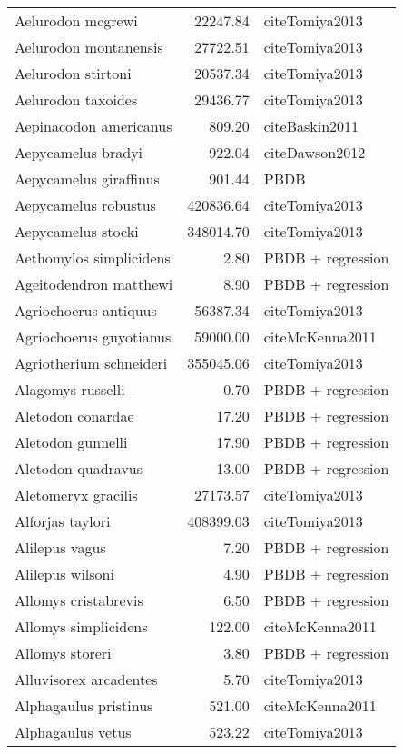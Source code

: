\begin{table}[ht]
\begin{tabular}{lrl}
  Aelurodon mcgrewi & 22247.84 & cite{Tomiya2013} \\ 
  Aelurodon montanensis & 27722.51 & cite{Tomiya2013} \\ 
  Aelurodon stirtoni & 20537.34 & cite{Tomiya2013} \\ 
  Aelurodon taxoides & 29436.77 & cite{Tomiya2013} \\ 
  Aepinacodon americanus & 809.20 & cite{Baskin2011} \\ 
  Aepycamelus bradyi & 922.04 & cite{Dawson2012} \\ 
  Aepycamelus giraffinus & 901.44 & PBDB \\ 
  Aepycamelus robustus & 420836.64 & cite{Tomiya2013} \\ 
  Aepycamelus stocki & 348014.70 & cite{Tomiya2013} \\ 
  Aethomylos simplicidens & 2.80 & PBDB + regression \\ 
  Ageitodendron matthewi & 8.90 & PBDB + regression \\ 
  Agriochoerus antiquus & 56387.34 & cite{Tomiya2013} \\ 
  Agriochoerus guyotianus & 59000.00 & cite{McKenna2011} \\ 
  Agriotherium schneideri & 355045.06 & cite{Tomiya2013} \\ 
  Alagomys russelli & 0.70 & PBDB + regression \\ 
  Aletodon conardae & 17.20 & PBDB + regression \\ 
  Aletodon gunnelli & 17.90 & PBDB + regression \\ 
  Aletodon quadravus & 13.00 & PBDB + regression \\ 
  Aletomeryx gracilis & 27173.57 & cite{Tomiya2013} \\ 
  Alforjas taylori & 408399.03 & cite{Tomiya2013} \\ 
  Alilepus vagus & 7.20 & PBDB + regression \\ 
  Alilepus wilsoni & 4.90 & PBDB + regression \\ 
  Allomys cristabrevis & 6.50 & PBDB + regression \\ 
  Allomys simplicidens & 122.00 & cite{McKenna2011} \\ 
  Allomys storeri & 3.80 & PBDB + regression \\ 
  Alluvisorex arcadentes & 5.70 & cite{Tomiya2013} \\ 
  Alphagaulus pristinus & 521.00 & cite{McKenna2011} \\ 
  Alphagaulus vetus & 523.22 & cite{Tomiya2013} \\ 

\end{tabular}
\end{table}
